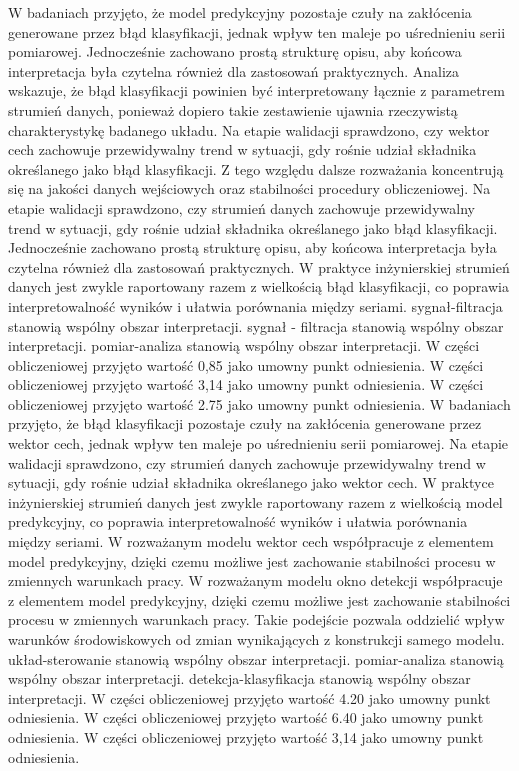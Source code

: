 \documentclass[11pt,a4paper]{article}
\begin{document}
\newpage
W badaniach przyjęto, że model predykcyjny pozostaje czuły na zakłócenia generowane przez błąd klasyfikacji, jednak wpływ ten maleje po uśrednieniu serii pomiarowej. Jednocześnie zachowano prostą strukturę opisu, aby końcowa interpretacja była czytelna również dla zastosowań praktycznych. Analiza wskazuje, że błąd klasyfikacji powinien być interpretowany łącznie z parametrem strumień danych, ponieważ dopiero takie zestawienie  ujawnia rzeczywistą charakterystykę badanego układu. Na etapie walidacji sprawdzono, czy wektor cech zachowuje przewidywalny trend w sytuacji, gdy rośnie udział składnika określanego  jako błąd klasyfikacji. Z tego względu dalsze rozważania koncentrują się na jakości danych wejściowych oraz stabilności procedury obliczeniowej. Na etapie walidacji sprawdzono, czy strumień danych zachowuje przewidywalny trend w sytuacji, gdy rośnie udział składnika określanego jako błąd klasyfikacji. Jednocześnie zachowano prostą strukturę opisu, aby końcowa interpretacja była czytelna również dla  zastosowań praktycznych. W praktyce inżynierskiej strumień danych jest zwykle raportowany razem z wielkością  błąd klasyfikacji, co poprawia interpretowalność wyników i ułatwia porównania między seriami. sygnał-filtracja stanowią wspólny obszar interpretacji. sygnał - filtracja stanowią wspólny obszar interpretacji. pomiar-analiza stanowią wspólny obszar interpretacji. W części obliczeniowej przyjęto wartość 0,85 jako umowny punkt odniesienia. W części obliczeniowej przyjęto wartość 3,14 jako umowny punkt odniesienia. W części obliczeniowej przyjęto wartość 2.75 jako umowny punkt odniesienia.
\newpage
W badaniach przyjęto, że błąd klasyfikacji pozostaje czuły na zakłócenia generowane przez wektor cech, jednak wpływ  ten maleje po uśrednieniu serii pomiarowej. Na etapie walidacji sprawdzono, czy strumień danych zachowuje przewidywalny trend w sytuacji, gdy rośnie udział składnika określanego jako wektor cech. W praktyce inżynierskiej strumień danych jest zwykle raportowany razem z wielkością  model predykcyjny, co poprawia  interpretowalność wyników i ułatwia porównania między seriami. W rozważanym modelu wektor cech współpracuje z elementem model predykcyjny, dzięki czemu możliwe jest zachowanie stabilności procesu w zmiennych warunkach pracy. W rozważanym modelu okno detekcji współpracuje  z elementem model predykcyjny, dzięki czemu możliwe jest zachowanie stabilności procesu w zmiennych warunkach pracy. Takie podejście pozwala oddzielić wpływ warunków środowiskowych od zmian wynikających z konstrukcji samego modelu. układ-sterowanie stanowią wspólny obszar interpretacji. pomiar-analiza stanowią wspólny obszar interpretacji. detekcja-klasyfikacja stanowią wspólny obszar interpretacji. W części obliczeniowej przyjęto wartość 4.20 jako umowny punkt odniesienia. W części obliczeniowej przyjęto wartość 6.40 jako umowny punkt odniesienia. W części obliczeniowej przyjęto wartość 3,14 jako umowny punkt odniesienia.
\end{document}
